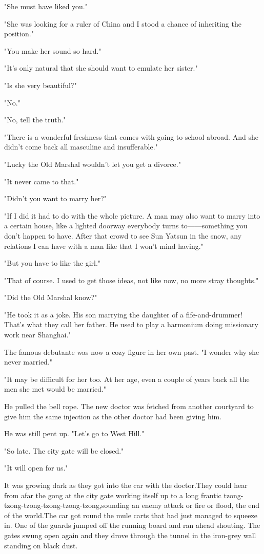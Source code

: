 \par "She must have liked you."
\par "She was looking for a ruler of China and I stood a chance of inheriting the position."
\par "You make her sound so hard."
\par "It's only natural that she should want to emulate her sister."
\par "Is she very beautiful?"
\par "No."
\par "No, tell the truth."
\par "There is a wonderful freshness that comes with going to school abroad. And she didn't come back all masculine and insufferable."
\par "Lucky the Old Marshal wouldn't let you get a divorce."
\par "It never came to that."
\par "Didn't you want to marry her?"
\par "If I did it had to do with the whole picture. A man may also want to marry into a certain house, like a lighted doorway everybody turns to——something you don't happen to have. After that crowd to see Sun Yatsun in the snow, any relations I can have with a man like that I won't mind having."
\par "But you have to like the girl."
\par "That of course. I used to get those ideas, not like now, no more stray thoughts."
\par "Did the Old Marshal know?"
\par "He took it as a joke. His son marrying the daughter of a fife-and-drummer! That's what they call her father. He used to play a harmonium doing missionary work near Shanghai."
\par The famous debutante was now a cozy figure in her own past. "I wonder why she never married."
\par "It may be difficult for her too. At her age, even a couple of years back all the men she met would be married."
\par He pulled the bell rope. The new doctor was fetched from another courtyard to give him the same injection as the other doctor had been giving him.
\par He was still pent up. "Let's go to West Hill."
\par "So late. The city gate will be closed."
\par "It will open for us."
\par It was growing dark as they got into the car with the doctor.They could hear from afar the gong at the city gate working itself up to a long frantic tzong-tzong-tzong-tzong-tzong-tzong,sounding an enemy attack or fire or flood, the end of the world.The car got round the mule carts that had just managed to squeeze in. One of the guards jumped off the running board and ran ahead shouting. The gates swung open again and they drove through the tunnel in the iron-grey wall standing on black dust.
